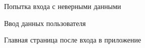 \begin{figure}[H]
	\caption{Попытка входа с неверными данными}
	\label{signin_test1:image}
\end{figure}

\begin{figure}[H]
	\caption{Ввод данных пользователя}
	\label{signin_test2:image}
\end{figure}

\begin{figure}[H]
	\caption{Главная страница после входа в приложение}
	\label{signin_test3:image}
\end{figure}